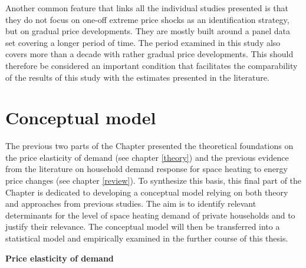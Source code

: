 \documentclass[12pt,twoside]{reedthesis}
\begin{document}
Another common feature that links all the individual studies presented is that they do not focus on one-off extreme price shocks as an identification strategy, but on gradual price developments. They are mostly built around a panel data set covering a longer period of time. The period examined in this study also covers more than a decade with rather gradual price developments. This should therefore be considered an important condition that facilitates the comparability of the results of this study with the estimates presented in the literature.

\hypertarget{conceptual-model}{%
\section{Conceptual model}\label{conceptual-model}}

The previous two parts of the Chapter presented the theoretical foundations on the price elasticity of demand (see chapter \ref{theory}) and the previous evidence from the literature on household demand response for space heating to energy price changes (see chapter \ref{review}). To synthesize this basis, this final part of the Chapter is dedicated to developing a conceptual model relying on both theory and approaches from previous studies. The aim is to identify relevant determinants for the level of space heating demand of private households and to justify their relevance. The conceptual model will then be transferred into a statistical model and empirically examined in the further course of this thesis.

\textbf{Price elasticity of demand}
\end{document}
